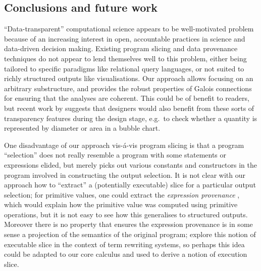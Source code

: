 \subsection{Conclusions and future work}

``Data-transparent'' computational science appears to be well-motivated problem because of an increasing interest in open, accountable practices in science and data-driven decision making. Existing program slicing and data provenance techniques do not appear to lend themselves well to this problem, either being tailored to specific paradigms like relational query languages, or not suited to richly structured outputs like visualisations. Our approach allows focusing on an arbitrary substructure, and provides the robust properties of Galois connections for ensuring that the analyses are coherent. This could be of benefit to readers, but recent work by \citet{walny19} suggests that designers would also benefit from these sorts of transparency features during the design stage, e.g.~to check whether a quantity is represented by diameter or area in a bubble chart.

One disadvantage of our approach vis-\'a-vis program slicing is that a program ``selection'' does not really resemble a program with some statements or expressions elided, but merely picks out various constants and constructors in the program involved in constructing the output selection. It is not clear with our approach how to ``extract'' a (potentially executable) slice for a particular output selection; for primitive values, one could extract the \emph{expression provenance} \cite{acar12}, which would explain how the primitive value was computed using primitive operations, but it is not easy to see how this generalises to structured outputs. Moreover there is no property that ensures the expression provenance is in some sense a projection of the semantics of the original program; \cite{field98} explore this notion of executable slice in the context of term rewriting systems, so perhaps this idea could be adapted to our core calculus and used to derive a notion of execution slice.
